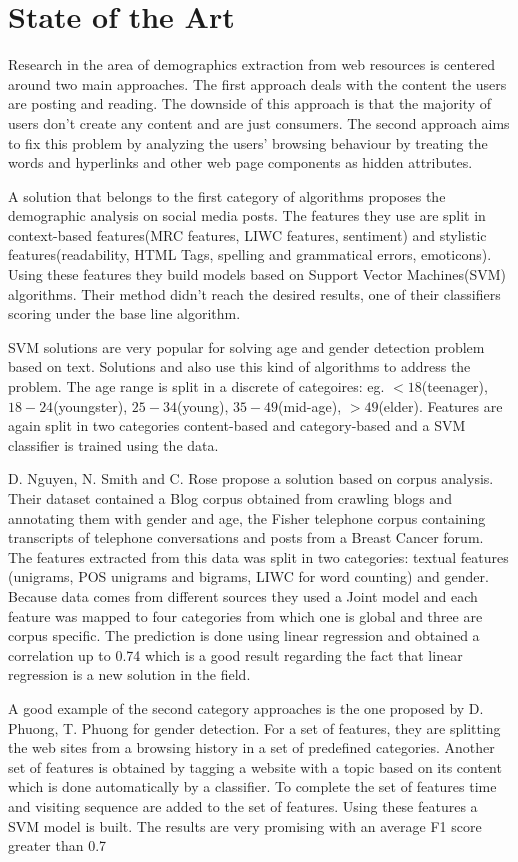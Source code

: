 \section{State of the Art}

Research in the area of demographics extraction from web resources is centered around two main approaches. The first approach deals with the content the users are posting and reading. The downside of this approach is that the majority of users don't create any content and are just consumers. The second approach aims to fix this problem by analyzing the users' browsing behaviour by treating the words and hyperlinks and other web page components as hidden attributes.

A solution that belongs to the first category of algorithms proposes the demographic analysis on social media posts\cite{Marquardt}. The features they use are split in context-based features(MRC features, LIWC features, sentiment) and stylistic features(readability, HTML Tags, spelling and grammatical errors, emoticons). Using these features they build models based on Support Vector Machines(SVM) algorithms. Their method didn't reach the desired results, one of their classifiers scoring under the base line algorithm.

SVM solutions are very popular for solving age and gender detection problem based on text. Solutions \cite{Hu} and \cite{Kabbur} also use this kind of algorithms to address the problem. The age range is split in a discrete of categoires: eg. $<18$(teenager), $18-24$(youngster), $25-34$(young), $35-49$(mid-age), $>49$(elder). Features are again split in two categories content-based and category-based and a SVM classifier is trained using the data.

D. Nguyen, N. Smith and C. Rose\cite{Nguyen} propose a solution based on corpus analysis.  Their dataset contained a Blog corpus obtained from crawling blogs and annotating them with gender and age, the Fisher telephone corpus containing transcripts of telephone conversations and posts from a Breast Cancer forum. The features extracted from this data was split in two categories: textual features (unigrams, POS unigrams and bigrams, LIWC for word counting) and gender. Because data comes from different sources they used a Joint model and each feature was mapped to four categories from which one is global and three are corpus specific. The prediction is done using linear regression and obtained a correlation up to 0.74 which is a good result regarding the fact that linear regression is a new solution in the field.

A good example of the second category approaches is the one proposed by D. Phuong, T. Phuong\cite{Phuong} for gender detection. For a set of features, they are splitting the web sites from a browsing history in a set of predefined categories. Another set of features is obtained by tagging a website with a topic based on its content which is done automatically by a classifier. To complete the set of features time and visiting sequence are added to the set of features. Using these features a SVM model is built. The results are very promising with an average F1 score greater than 0.7
 
